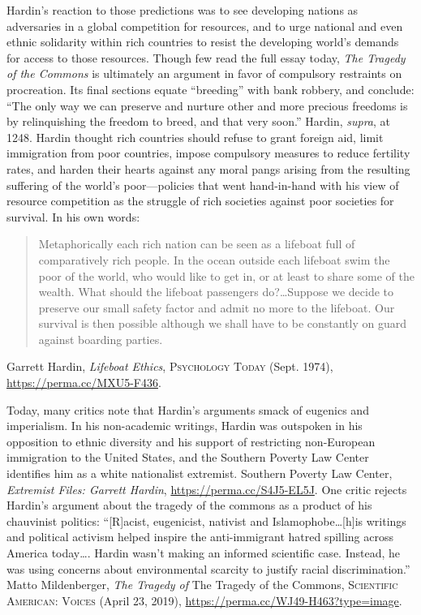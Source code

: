 Hardin's reaction to those predictions was to see developing nations as
adversaries in a global competition for resources, and to urge national and even
ethnic solidarity within rich countries to resist the developing world's demands
for access to those resources. Though few read the full essay today, \textit{The
Tragedy of the Commons} is ultimately an argument in favor of compulsory
restraints on procreation. Its final sections equate ``breeding'' with bank
robbery, and conclude: ``The only way we can preserve and nurture other and more
precious freedoms is by relinquishing the freedom to breed, and that very
soon.'' Hardin, \textit{supra}, at 1248. Hardin thought rich countries should
refuse to grant foreign aid, limit immigration from poor countries, impose
compulsory measures to reduce fertility rates, and harden their hearts against
any moral pangs arising from the resulting suffering of the world's
poor---policies that went hand-in-hand with his view of resource competition as
the struggle of rich societies against poor societies for survival. In his own
words:
\begin{quote}
Metaphorically each rich nation can be seen as a lifeboat full of comparatively
rich people. In the ocean outside each lifeboat swim the poor of the world, who
would like to get in, or at least to share some of the wealth. What should the
lifeboat passengers do?\ldots Suppose we decide to preserve our small safety
factor and admit no more to the lifeboat. Our survival is then possible although
we shall have to be constantly on guard against boarding parties.
\end{quote}
Garrett Hardin, \textit{Lifeboat Ethics},
\textsc{Psychology Today} (Sept. 1974), \url{https://perma.cc/MXU5-F436}. 

Today, many critics note that Hardin's arguments smack of eugenics and
imperialism. In his non-academic writings, Hardin was outspoken in his
opposition to ethnic diversity and his support of restricting non-European
immigration to the United States, and the Southern Poverty Law Center identifies
him as a white nationalist extremist. Southern Poverty Law Center,
\textit{Extremist Files: Garrett Hardin},
\url{https://perma.cc/S4J5-EL5J}. One critic rejects Hardin's argument about the
tragedy of the commons as a product of his chauvinist politics: ``[R]acist,
eugenicist, nativist and Islamophobe\ldots [h]is writings and political activism
helped inspire the anti-immigrant hatred spilling across America today\ldots .
Hardin wasn't making an informed scientific case. Instead, he was using concerns
about environmental scarcity to justify racial discrimination.'' Matto
Mildenberger, \textit{The Tragedy
of} The Tragedy of the Commons, \textsc{Scientific American: Voices} (April 23,
2019), \url{https://perma.cc/WJ49-H463?type=image}. 

